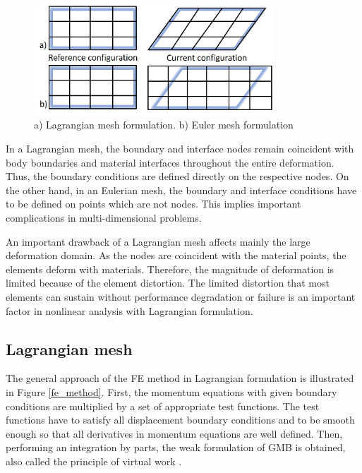 \begin{figure}[!h]
\centering
\includegraphics[width=0.8\textwidth,keepaspectratio]{figures/lagrangian_mesh.jpg} 
\caption{a) Lagrangian mesh formulation. b) Euler mesh formulation}
\label{lagrangian_mesh}
\end{figure}
 

In a Lagrangian mesh, the boundary and interface nodes remain coincident with body boundaries and material interfaces throughout the entire deformation. Thus, the boundary conditions are defined directly on the respective nodes. On the other hand, in an Eulerian mesh, the boundary and interface conditions have to be defined on points which are not nodes. This implies important complications in multi-dimensional problems.  

An important drawback of a Lagrangian mesh affects mainly the large deformation domain. As the nodes are coincident with the material points, the elements deform with materials. Therefore, the magnitude of deformation is limited because of the element distortion. The limited distortion that most elements can sustain without performance degradation or failure is an important factor in nonlinear analysis with Lagrangian formulation. 
 

\subsection{Lagrangian mesh}\label{subsection:lagrangianmesh}

The general approach of the FE method in Lagrangian formulation is illustrated in Figure \ref{fe_method}. First, the momentum equations with given boundary conditions are multiplied by a set of appropriate test functions. The test functions have to satisfy all displacement boundary conditions and to be smooth enough so that all derivatives in momentum equations are well defined. Then, performing an integration by parts, the weak formulation of GMB is obtained, also called the principle of virtual work \citep{belytschko_nonlinear_2013}. 

